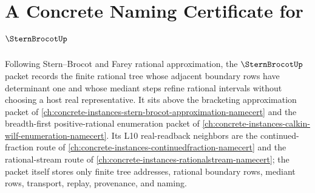 \chapter{A Concrete Naming Certificate for $\SternBrocotUp$}
\label{ch:concrete-instances-stern-brocot-namecert}

Following Stern--Brocot and Farey rational approximation, the $\SternBrocotUp$ packet records the finite rational tree whose adjacent boundary rows have determinant one and whose mediant steps refine rational intervals without choosing a host real representative. It sits above the bracketing approximation packet of \autoref{ch:concrete-instances-stern-brocot-approximation-namecert} and the breadth-first positive-rational enumeration packet of \autoref{ch:concrete-instances-calkin-wilf-enumeration-namecert}. Its L10 real-readback neighbors are the continued-fraction route of \autoref{ch:concrete-instances-continuedfraction-namecert} and the rational-stream route of \autoref{ch:concrete-instances-rationalstream-namecert}; the packet itself stores only finite tree addresses, rational boundary rows, mediant rows, transport, replay, provenance, and naming.

